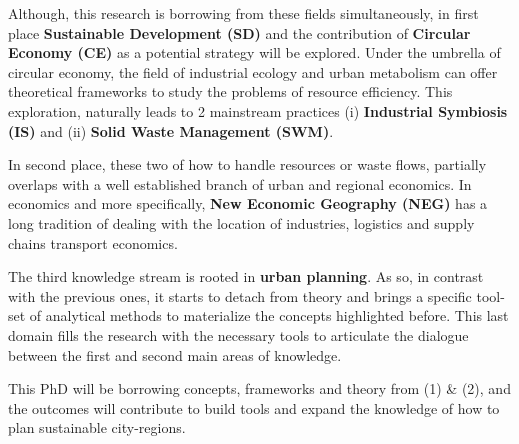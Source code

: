 Although, this research is borrowing from these fields simultaneously, in first place \textbf{Sustainable Development (SD)} and the contribution of \textbf{Circular Economy (CE)} as a potential strategy will be explored. Under the umbrella of circular economy, the field of industrial ecology and urban metabolism can offer theoretical frameworks to study the problems of resource efficiency. This exploration, naturally leads to 2 mainstream practices (i) \textbf{Industrial Symbiosis (IS)} and (ii) \textbf{Solid Waste Management (SWM)}. \par  

In second place, these two of how to handle resources or waste flows, partially overlaps with a well established branch of urban and regional economics. In economics and more specifically, \textbf{New Economic Geography (NEG)} has a long tradition of dealing with the location of industries, logistics and supply chains transport economics.\par

The third knowledge stream is rooted in \textbf{urban planning}. As so, in contrast with the previous ones, it starts to detach from theory and brings a specific tool-set of analytical methods to materialize the concepts highlighted before. This last domain fills the research with the necessary tools to articulate the dialogue between the first and second main areas of knowledge. \par 
This PhD will be borrowing concepts, frameworks and theory from (1) \& (2), and the outcomes will contribute to build tools and expand the knowledge of how to plan sustainable city-regions. \par




















